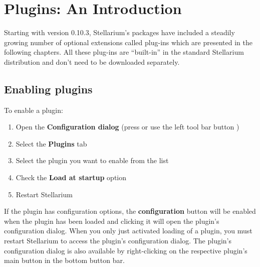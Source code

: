 
\chapter{Plugins: An Introduction}
\label{ch:Plugins}

Starting with version 0.10.3, Stellarium's packages have included a steadily growing number of
optional extensions called plug-ins which are presented in the following chapters.
All these plug-ins are ``built-in'' in the standard Stellarium distribution
and don't need to be downloaded separately.


\section{Enabling plugins}
\label{sec:Plugins:EnablingPlugins}


To enable a plugin:

\begin{enumerate}
\item Open the \textbf{Configuration dialog} (press  or use
  the left tool bar button )
\item Select the \textbf{Plugins} tab
\item Select the plugin you want to enable from the list
\item Check the \textbf{Load at startup} option
\item Restart Stellarium
\end{enumerate}

\noindent If the plugin has configuration options, the
\textbf{configuration} button will be enabled when the plugin has been
loaded and clicking it will open the plugin's configuration
dialog. When you only just activated loading of a plugin, you must
restart Stellarium to access the plugin's configuration dialog.  The
plugin's configuration dialog  is also available by
right-clicking on the respective plugin's main button in the bottom
button bar.

